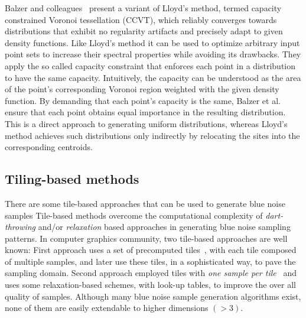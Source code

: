 Balzer and colleagues~\cite{Balzer:2009:CPD:1531326.1531392} present a variant of Lloyd’s method, termed capacity constrained Voronoi 
tessellation (CCVT), which reliably converges towards distributions that exhibit no regularity artifacts and precisely adapt 
to given density functions. Like Lloyd’s 
method it can be used to optimize arbitrary input point sets to increase their spectral properties while avoiding its 
drawbacks. They apply the so called capacity constraint that enforces each point in a distribution to have the same 
capacity. Intuitively, the capacity can be understood as the area of the point’s corresponding Voronoi region weighted with 
the given density function. By demanding that each point’s capacity is the same, Balzer et al. ensure that each point 
obtains equal importance in the resulting distribution. This is a direct approach to generating uniform 
distributions, whereas Lloyd’s method achieves such distributions only indirectly by relocating the sites into the 
corresponding centroids.

\subsection{Tiling-based methods}

There are some tile-based approaches that can be used to generate blue noise samples 
Tile-based methods overcome the computational complexity of  
\emph{dart-throwing} and/or \emph{relaxation} based approaches in generating blue noise sampling patterns. In computer graphics community, two tile-based approaches are well known: First approach uses a set of precomputed tiles~\cite{Cohen:2003,Kopf:2006:RWT}, with each tile composed of multiple samples, and later use these tiles, in a sophisticated way, to pave the sampling domain. Second approach employed tiles with \emph{one sample per tile}~\cite{Ostromoukhov:2004:FHI,Ostromoukhov:2007:SP:1275808.1276475,Wachtel:2014:FTA} and uses some relaxation-based schemes, with look-up tables, to improve the over all quality of samples. 
Although many blue noise sample generation algorithms exist, none of them are easily extendable to higher dimensions $(> 3)$.

